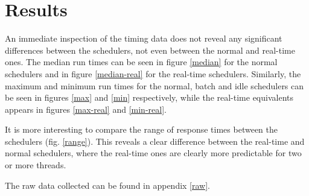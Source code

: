 \documentclass[12pt, a4paper]{article} %
\begin{document}
\section{Results}

An immediate inspection of the timing data does not reveal any significant differences between the schedulers, not even between the normal and real-time ones.
The median run times can be seen in figure \ref{median} for the normal schedulers and in figure \ref{median-real} for the real-time schedulers.
Similarly, the maximum and minimum run times for the normal, batch and idle schedulers can be seen in figures \ref{max} and \ref{min} respectively, while the real-time equivalents appears in figures \ref{max-real} and \ref{min-real}.

It is more interesting to compare the range of response times between the schedulers (fig. \ref{range}).
This reveals a clear difference between the real-time and normal schedulers, where the real-time ones are clearly more predictable for two or more threads.

The raw data collected can be found in appendix \ref{raw}.
\end{document}
